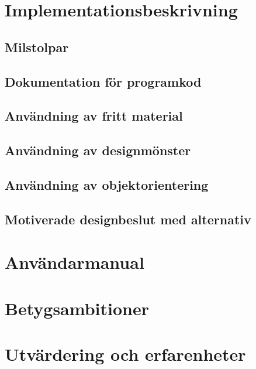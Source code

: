 \section{Implementationsbeskrivning}
\subsection{Milstolpar}
\subsection{Dokumentation för programkod}
\subsection{Användning av fritt material}
\subsection{Användning av designmönster}
\subsection{Användning av objektorientering}
\subsection{Motiverade designbeslut med alternativ}

\section{Användarmanual}
\section{Betygsambitioner}
\section{Utvärdering och erfarenheter}
